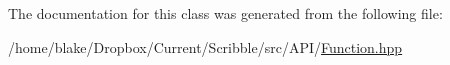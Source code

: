 The documentation for this class was generated from the following file\-:\begin{DoxyCompactItemize}
\item 
/home/blake/\-Dropbox/\-Current/\-Scribble/src/\-A\-P\-I/\hyperlink{_function_8hpp}{Function.\-hpp}\end{DoxyCompactItemize}
